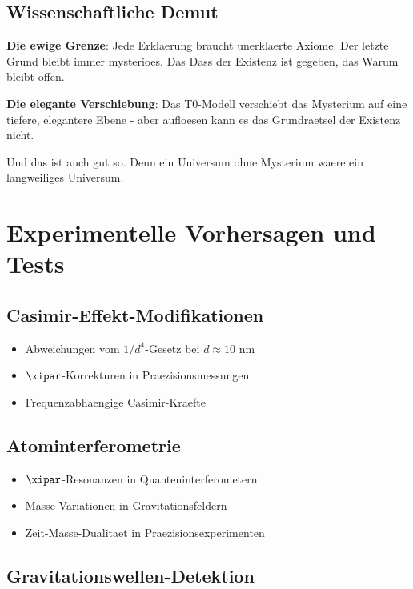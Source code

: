 	\subsection{Wissenschaftliche Demut}
	
	\textbf{Die ewige Grenze}:
	Jede Erklaerung braucht unerklaerte Axiome. Der letzte Grund bleibt immer mysterioes. Das Dass der Existenz ist gegeben, das Warum bleibt offen.
	
	\textbf{Die elegante Verschiebung}:
	Das T0-Modell verschiebt das Mysterium auf eine tiefere, elegantere Ebene - aber aufloesen kann es das Grundraetsel der Existenz nicht.
	
	Und das ist auch gut so. Denn ein Universum ohne Mysterium waere ein langweiliges Universum.
	
	\section{Experimentelle Vorhersagen und Tests}
	
	\subsection{Casimir-Effekt-Modifikationen}
	
	\begin{itemize}
		\item Abweichungen vom $1/d^4$-Gesetz bei $d \approx 10$ nm
		\item $\xipar$-Korrekturen in Praezisionsmessungen
		\item Frequenzabhaengige Casimir-Kraefte
	\end{itemize}
	
	\subsection{Atominterferometrie}
	
	\begin{itemize}
		\item $\xipar$-Resonanzen in Quanteninterferometern
		\item Masse-Variationen in Gravitationsfeldern
		\item Zeit-Masse-Dualitaet in Praezisionsexperimenten
	\end{itemize}
	
	\subsection{Gravitationswellen-Detektion}
	

